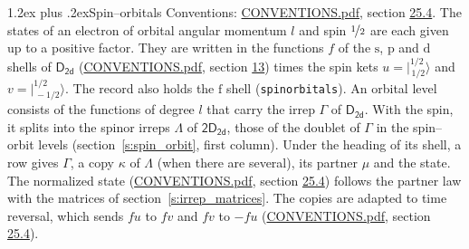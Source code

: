 \documentclass[10pt,a4paper]{article}
\makeatletter
\renewcommand\section{\@startsection{section}{1}{\z@}{-3ex plus -1ex minus -.2ex}%
  {1.2ex plus .2ex}{\normalfont\large\sffamily\bfseries\color{parttitle}}}
\numberwithin{equation}{section}
\newcommand{\grp}[1]{\mathsf{#1}}
\newcommand{\orbital}[1]{\mathrm{#1}}
\newcommand{\mult}{\kappa}
\newcommand{\intx}{\mu}
\newcommand{\jm}[2]{\bigl\lvert{}^{#1}_{\,#2}\bigr\rangle}
\makeatother
\begin{document}
\section{Spin--orbitals}\label{s:spin_orbitals}
Conventions: \href{../../CONVENTIONS.pdf}{CONVENTIONS.pdf}, section \href{../../CONVENTIONS.pdf\#conv.25.4}{25.4}.
\leavevmode\label{n:index.orbital.l}The states of an electron of orbital angular momentum $l$ and spin $\nicefrac{1}{2}$ are each given up to a positive factor. \label{n:local.spinor.uv}\label{n:local.function.f}They are written in the functions $f$ of the $\orbital{s}$, $\orbital{p}$ and $\orbital{d}$ shells of \href{../../../rotation/data/pdf/D2d.pdf}{$\grp{D_{2d}}$} (\href{../../CONVENTIONS.pdf}{CONVENTIONS.pdf}, section \href{../../../rotation/CONVENTIONS.pdf\#conv.13}{13}) times the spin kets $u = \jm{1/2}{1/2}$ and $v = \jm{1/2}{-1/2}$. The record also holds the $\orbital{f}$ shell (\texttt{spinorbitals}). An orbital level consists of the functions of degree $l$ that carry the irrep $\Gamma$ of \href{../../../rotation/data/pdf/D2d.pdf}{$\grp{D_{2d}}$}. With the spin, it splits into the spinor irreps $\Lambda$ of $\grp{2D_{2d}}$, those of the doublet of $\Gamma$ in the spin--orbit levels (section~\ref{s:spin_orbit}, first column). \label{n:head.state}Under the heading of its shell, a row gives $\Gamma$, a copy $\mult$ of $\Lambda$ (when there are several), its partner $\intx$ and the state. The normalized state (\href{../../CONVENTIONS.pdf}{CONVENTIONS.pdf}, section \href{../../CONVENTIONS.pdf\#conv.25.4}{25.4}) follows the partner law with the matrices of section~\ref{s:irrep_matrices}. The copies are adapted to time reversal, which sends $f u$ to $f v$ and $f v$ to $-f u$ (\href{../../CONVENTIONS.pdf}{CONVENTIONS.pdf}, section \href{../../CONVENTIONS.pdf\#conv.25.4}{25.4}).
\end{document}
